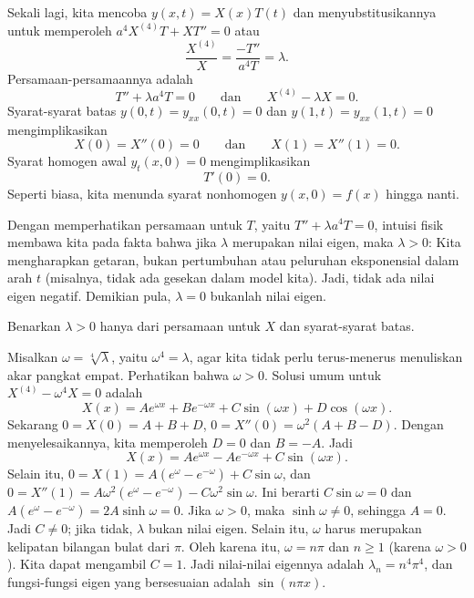 Sekali lagi, kita mencoba $y(x,t) = X(x)T(t)$ dan menyubstitusikannya untuk memperoleh
$a^4 X^{(4)}T + XT'' = 0$ atau 
\begin{equation*}
\frac{X^{(4)}}{X} = \frac{- T''}{a^4T} = \lambda .
\end{equation*}
Persamaan-persamaannya adalah
\begin{equation*}
T'' + \lambda a^4 T = 0
\qquad \text{dan} \qquad
X^{(4)} - \lambda X = 0 .
\end{equation*}
Syarat-syarat batas
$y(0,t) = y_{xx}(0,t) = 0$ dan $y(1,t) = y_{xx}(1,t) = 0$ mengimplikasikan
\begin{equation*}
X(0) =  X''(0) = 0
\qquad \text{dan} \qquad
X(1) =  X''(1) = 0 .
\end{equation*}
Syarat homogen awal $y_t(x,0) = 0$ mengimplikasikan
\begin{equation*}
T'(0) = 0 .
\end{equation*}
Seperti biasa, kita menunda syarat nonhomogen $y(x,0) = f(x)$ hingga nanti.

Dengan memperhatikan persamaan untuk $T$, yaitu
$T'' + \lambda a^4 T = 0$, intuisi fisik membawa kita
pada fakta bahwa jika $\lambda$ merupakan nilai eigen, maka $\lambda > 0$:
Kita mengharapkan getaran, bukan pertumbuhan atau
peluruhan eksponensial dalam arah $t$ (misalnya, tidak ada gesekan dalam model kita).
Jadi, tidak ada nilai eigen negatif.
Demikian pula, $\lambda = 0$ bukanlah nilai eigen.

\begin{exercise}
Benarkan $\lambda > 0$ hanya dari persamaan untuk $X$ dan syarat-syarat
batas.
\end{exercise}

Misalkan $\omega = \sqrt[4]{\lambda}$, yaitu $\omega^4 = \lambda$,
agar kita tidak perlu terus-menerus menuliskan akar pangkat empat.
Perhatikan bahwa $\omega > 0$.
Solusi umum untuk
$X^{(4)} - \omega^4 X = 0$ adalah
\begin{equation*}
X(x) = A e^{\omega x} + B e^{-\omega x} + C \sin (\omega x) +
D \cos (\omega x) .
\end{equation*}
Sekarang $0 = X(0) = A+B+D$, $0 = X''(0) = \omega^2 (A + B - D)$.
Dengan menyelesaikannya, kita memperoleh
$D = 0$ dan $B = -A$.
Jadi
\begin{equation*}
X(x) = A e^{\omega x} - A e^{-\omega x} + C \sin (\omega x) .
\end{equation*}
Selain itu, $0 = X(1) = A (e^{\omega} - e^{-\omega}) + C \sin \omega$, dan
$0 = X''(1) = A \omega^2 (e^{\omega} - e^{-\omega}) - C \omega^2 \sin \omega$.
Ini berarti $C \sin \omega  = 0$ dan 
$A (e^{\omega} - e^{-\omega}) = 2 A \sinh \omega = 0$.  Jika $\omega > 0$, maka
$\sinh \omega \neq 0$, sehingga $A = 0$.  Jadi $C \neq 0$; jika tidak,
$\lambda$ bukan
nilai eigen.  Selain itu, $\omega$ harus merupakan kelipatan bilangan bulat dari
$\pi$.  Oleh karena itu, $\omega = n \pi$ dan $n \geq 1$ (karena $\omega > 0$).  Kita dapat mengambil
$C=1$.  Jadi nilai-nilai eigennya adalah $\lambda_n = n^4 \pi^4$, dan fungsi-fungsi eigen yang bersesuaian
adalah $\sin (n \pi x)$.

